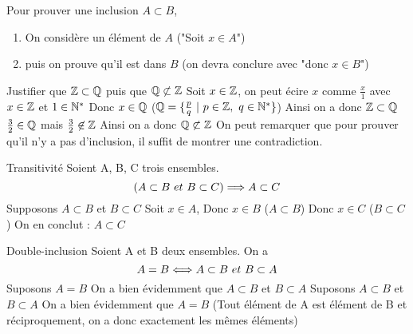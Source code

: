 \documentclass[11pt]{article}
\begin{document}
\begin{meth*}{}{}
    Pour prouver une inclusion $A \subset B$,
    \begin{enumerate}
        \item On considère un élément de $A$ ("Soit $x \in A$")
        \item puis on prouve qu'il est dans $B$ (on devra conclure avec "donc $x \in B$")
    \end{enumerate}
\end{meth*}

\begin{ex}{}{}
    Justifier que $\mathbb{Z} \subset \mathbb{Q}$ puis que $\mathbb{Q} \not \subset \mathbb{Z}$
    \tcblower
    Soit $x \in \mathbb{Z}$, on peut écire $x$ comme $\frac{x}{1}$ avec $x \in \mathbb{Z}$ et $1 \in \mathbb{N}^{*}$\n
    Donc $x \in \mathbb{Q}$ ($\mathbb{Q} = \{ \frac{p}{q} ~|~ p \in \mathbb{Z}, ~ q \in \mathbb{N}^{*} \}$)\n
    Ainsi on a donc $\mathbb{Z} \subset \mathbb{Q}$ \n\n
    $\frac{3}{2} \in \mathbb{Q}$ mais $\frac{3}{2} \not \in \mathbb{Z}$\n
    Ainsi on a donc $\mathbb{Q} \not \subset \mathbb{Z}$\n
    On peut remarquer que pour prouver qu'il n'y a pas d'inclusion, il suffit de montrer une contradiction.
\end{ex}

\begin{prop}{Transitivité}{}
    Soient A, B, C trois ensembles.
    \begin{equation*}
        (A \subset B ~et~ B \subset C) \Longrightarrow A \subset C
    \end{equation*}
    \tcblower
    Supposons $A \subset B$ et $B \subset C$\n
    Soit $x \in A$, \n
    Donc $x \in B$ ($A \subset B$)\n
    Donc $x \in C$ ($B \subset C$)\n
    On en conclut : $A \subset C$
\end{prop}

\begin{thm}{Double-inclusion}{}
    Soient A et B deux ensembles. On a
    \begin{equation*}
        A = B \Longleftrightarrow A \subset B ~et~ B \subset A
    \end{equation*}
    \tcblower
    \boxed{\la} Suposons $A = B$\n
    On a bien évidemment que $A \subset B$ et $B \subset A$\n\n
    \boxed{\ra} Suposons $A \subset B$ et $B \subset A$ \n
    On a bien évidemment que $A = B$ (Tout élément de A est élément de B et réciproquement, on a donc exactement les mêmes éléments)
\end{thm}
\end{document}
